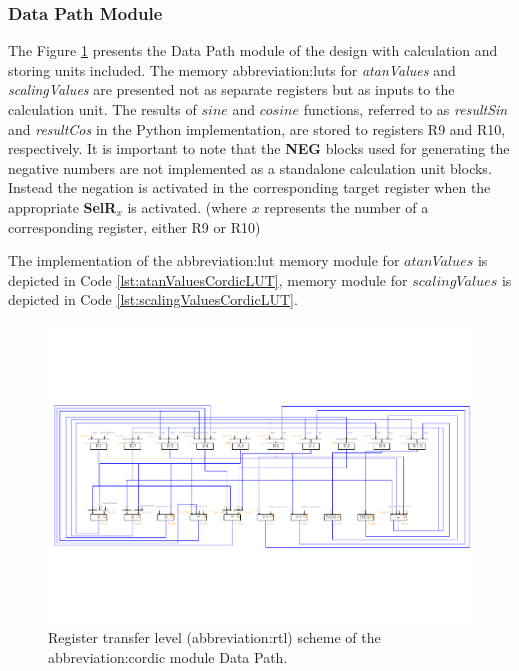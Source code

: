 \documentclass[a4paper, twoside, 11pt]{article}
\begin{document}
        \subsubsection{Data Path Module}
            The Figure \ref{fig:cordic-rtl} presents the Data Path module of the design with calculation and storing units included. The memory \gls{abbreviation:lut}s for \textit{atanValues} and \textit{scalingValues} are presented not as separate registers but as inputs to the calculation unit. The results of $sine$ and $cosine$ functions, referred to as \textit{resultSin} and \textit{resultCos} in the Python implementation, are stored to registers R9 and R10, respectively. It is important to note that the \textbf{NEG} blocks used for generating the negative numbers are not implemented as a standalone calculation unit blocks. Instead the negation is activated in the corresponding target register when the appropriate \textbf{SelR$_x$} is activated. (where $x$ represents the number of a corresponding register, either R9 or R10)\par
            The implementation of the \gls{abbreviation:lut} memory module for $atanValues$ is depicted in Code \ref{lst:atanValuesCordicLUT}, memory module for $scalingValues$ is depicted in Code \ref{lst:scalingValuesCordicLUT}.
            \begin{figure}[htbp!]
                \centering
                \includegraphics[width=1\textwidth]{src/pdf/cordic-rtl.pdf}
                \caption{Register transfer level (\gls{abbreviation:rtl}) scheme of the \gls{abbreviation:cordic} module Data Path.}
                \label{fig:cordic-rtl}
            \end{figure}
            
\end{document}
